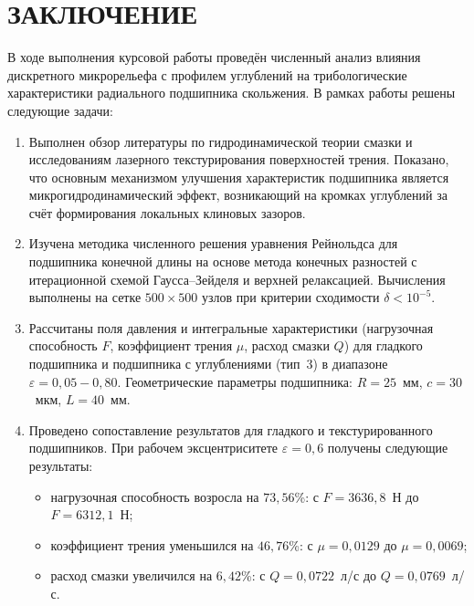 \section*{ЗАКЛЮЧЕНИЕ}
{}

В ходе выполнения курсовой работы проведён численный анализ влияния дискретного микрорельефа с \varDimpleTypeGenitive{} профилем углублений на трибологические характеристики радиального подшипника скольжения. В рамках работы решены следующие задачи:

\begin{enumerate}
    \item Выполнен обзор литературы по гидродинамической теории смазки и исследованиям лазерного текстурирования поверхностей трения. Показано, что основным механизмом улучшения характеристик подшипника является микрогидродинамический эффект, возникающий на кромках углублений за счёт формирования локальных клиновых зазоров.

    \item Изучена методика численного решения уравнения Рейнольдса для подшипника конечной длины на основе метода конечных разностей с итерационной схемой Гаусса--Зейделя и верхней релаксацией. Вычисления выполнены на сетке $500 \times 500$ узлов при критерии сходимости $\delta < 10^{-5}$.

    \item Рассчитаны поля давления и интегральные характеристики (нагрузочная способность $F$, коэффициент трения $\mu$, расход смазки $Q$) для гладкого подшипника и подшипника с \varDimpleTypeGenitive{} углублениями (тип~3) в диапазоне $\varepsilon = 0{,}05 - 0{,}80$. Геометрические параметры подшипника: $R = 25$~мм, $c = 30$~мкм, $L = 40$~мм.

    \item Проведено сопоставление результатов для гладкого и текстурированного подшипников. При рабочем эксцентриситете $\varepsilon = 0{,}6$ получены следующие результаты:
    \begin{itemize}
        \item нагрузочная способность возросла на $73{,}56$\%: с $F = 3636{,}8$~Н до $F = 6312{,}1$~Н;
        \item коэффициент трения уменьшился на $46{,}76$\%: с $\mu = 0{,}0129$ до $\mu = 0{,}0069$;
        \item расход смазки увеличился на $6{,}42$\%: с $Q = 0{,}0722$~л/с до $Q = 0{,}0769$~л/с.
    \end{itemize}
\end{enumerate}

